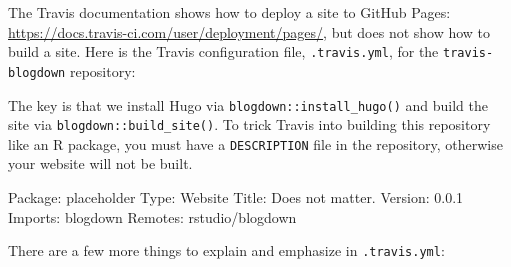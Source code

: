 \documentclass[12pt,]{krantz}
\makeatletter
\newenvironment{Shaded}{\begin{snugshade}}{\end{snugshade}}
\newcommand{\KeywordTok}[1]{\textcolor[rgb]{0.13,0.29,0.53}{\textbf{#1}}}
\newcommand{\StringTok}[1]{\textcolor[rgb]{0.31,0.60,0.02}{#1}}
\newcommand{\FunctionTok}[1]{\textcolor[rgb]{0.00,0.00,0.00}{#1}}
\newcommand{\AttributeTok}[1]{\textcolor[rgb]{0.77,0.63,0.00}{#1}}
\newcommand{\NormalTok}[1]{#1}
\newenvironment{kframe}{%
\medskip{}
\setlength{\fboxsep}{.8em}
 \def\at@end@of@kframe{}%
 \ifinner\ifhmode%
  \def\at@end@of@kframe{\end{minipage}}%
  \begin{minipage}{\columnwidth}%
 \fi\fi%
 \def\FrameCommand##1{\hskip\@totalleftmargin \hskip-\fboxsep
 \colorbox{shadecolor}{##1}\hskip-\fboxsep
     \hskip-\linewidth \hskip-\@totalleftmargin \hskip\columnwidth}%
 \MakeFramed {\advance\hsize-\width
   \@totalleftmargin\z@ \linewidth\hsize
   \@setminipage}}%
 {\par\unskip\endMakeFramed%
 \at@end@of@kframe}
\renewenvironment{Shaded}{\begin{kframe}}{\end{kframe}}
\theoremstyle{definition}
\theoremstyle{definition}
\theoremstyle{definition}
\theoremstyle{remark}
\makeatother
\begin{document}
The Travis documentation shows how to deploy a site to GitHub Pages:
\url{https://docs.travis-ci.com/user/deployment/pages/}, but does not
show how to build a site. Here is the Travis configuration file,
\texttt{.travis.yml}, for the \texttt{travis-blogdown} repository:

\begin{Shaded}
\end{Shaded}

The key is that we install Hugo via \texttt{blogdown::install\_hugo()}
and build the site via \texttt{blogdown::build\_site()}. To trick Travis
into building this repository like an R package, you must have a
\texttt{DESCRIPTION} file in the repository, otherwise your website will
not be built.

\begin{Shaded}
\begin{Highlighting}[]
\FunctionTok{Package:}\AttributeTok{ placeholder}
\FunctionTok{Type:}\AttributeTok{ Website}
\FunctionTok{Title:}\AttributeTok{ Does not matter.}
\FunctionTok{Version:}\AttributeTok{ 0.0.1}
\FunctionTok{Imports:}\AttributeTok{ blogdown}
\FunctionTok{Remotes:}\AttributeTok{ rstudio/blogdown}
\end{Highlighting}
\end{Shaded}

There are a few more things to explain and emphasize in
\texttt{.travis.yml}:
\end{document}
